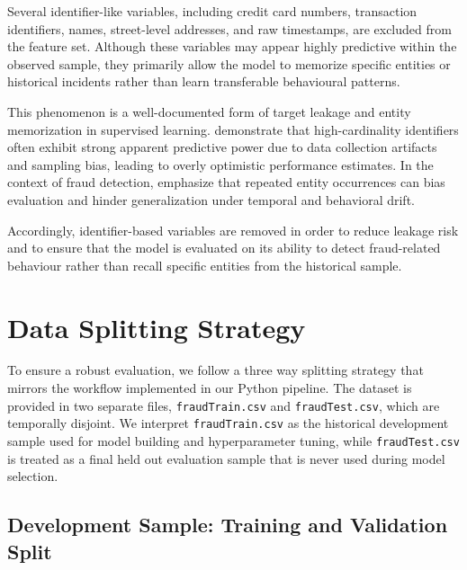 \documentclass[oneside,12pt,parskip=half,american,numbers=noenddot]{scrreprt}
\begin{document}
Several identifier-like variables, including credit card numbers, transaction identifiers, names, street-level addresses, and raw timestamps, are excluded from the feature set. Although these variables may appear highly predictive within the observed sample, they primarily allow the model to memorize specific entities or historical incidents rather than learn transferable behavioural patterns.

This phenomenon is a well-documented form of target leakage and entity memorization in supervised learning. \textcite{kaufman_leakage_2012} demonstrate that high-cardinality identifiers often exhibit strong apparent predictive power due to data collection artifacts and sampling bias, leading to overly optimistic performance estimates. In the context of fraud detection, \textcite{dal_pozzolo_credit_2015} emphasize that repeated entity occurrences can bias evaluation and hinder generalization under temporal and behavioral drift.

Accordingly, identifier-based variables are removed in order to reduce leakage risk and to ensure that the model is evaluated on its ability to detect fraud-related behaviour rather than recall specific entities from the historical sample.

\section{Data Splitting Strategy}
\label{sec:data_split}

To ensure a robust evaluation, we follow a three way splitting strategy that mirrors the workflow implemented in our Python pipeline. The dataset is provided in two separate files, \texttt{fraudTrain.csv} and \texttt{fraudTest.csv}, which are temporally disjoint. We interpret \texttt{fraudTrain.csv} as the historical development sample used for model building and hyperparameter tuning, while \texttt{fraudTest.csv} is treated as a final held out evaluation sample that is never used during model selection.

\subsection{Development Sample: Training and Validation Split}
\end{document}
